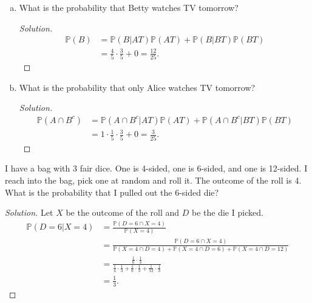 \documentclass[addpoints, 11pt]{exam}
\newcommand*{\prob}{\mathds{P}}
\begin{document}
\begin{description}
\begin{enumerate}[(a)]
        \begin{proof}[Solution]
            \begin{align}
                \prob(A \cap B) 
                &= \prob(A \cap B|AT)\prob(AT) + \prob(A \cap B|BT)\prob(BT) \\
                &= \prob(A|AT)\prob(B|AT)\prob(AT) \\
                &= 1 \cdot \frac{4}{5} \cdot \frac{3}{5} = \frac{12}{25}.
            \end{align}
        \end{proof}

        \item What is the probability that Betty watches TV tomorrow?

        \begin{proof}[Solution]
            \begin{align}
            \prob(B) 
            &= \prob(B|AT)\prob(AT) + \prob(B|BT)\prob(BT) \\
            &= \frac{4}{5} \cdot \frac{3}{5} + 0 = \frac{12}{25}.
            \end{align}
        \end{proof}

        \item What is the probability that only Alice watches TV tomorrow?

        \begin{proof}[Solution]
            \begin{align}
            \prob(A \cap B^c) 
            &= \prob(A \cap B^c|AT)\prob(AT) + \prob(A \cap B^c|BT)\prob(BT) \\
            &= 1 \cdot \frac{1}{5} \cdot \frac{3}{5} + 0 = \frac{3}{25}.
            \end{align}
        \end{proof}
    \end{enumerate}

\newpage

    \item[Question 4] I have a bag with 3 fair dice. One is 4-sided, one is 6-sided, and one is 12-sided. I reach into the bag, pick one at random and roll it. The outcome of the roll is 4. What is the probability that I pulled out the 6-sided die?

    \begin{proof}[Solution]
        Let $X$ be the outcome of the roll and $D$ be the die I picked.
        \begin{align}
            \prob(D = 6 | X = 4)
            &= \frac{\prob(D = 6 \cap X = 4)}{\prob(X = 4)} \\
            &= \frac{\prob(D = 6 \cap X = 4)}{\prob(X = 4 \cap D = 4) + \prob(X = 4 \cap D = 6) + \prob(X = 4 \cap D = 12)} \\
            &= \frac{\frac{1}{6} \cdot \frac{1}{3}}{\frac{1}{4} \cdot \frac{1}{3} + \frac{1}{6} \cdot \frac{1}{3} + \frac{1}{12} \cdot \frac{1}{3}} \\
            &= \frac{1}{3}.
        \end{align}
    \end{proof}


\end{description}
\end{document}
